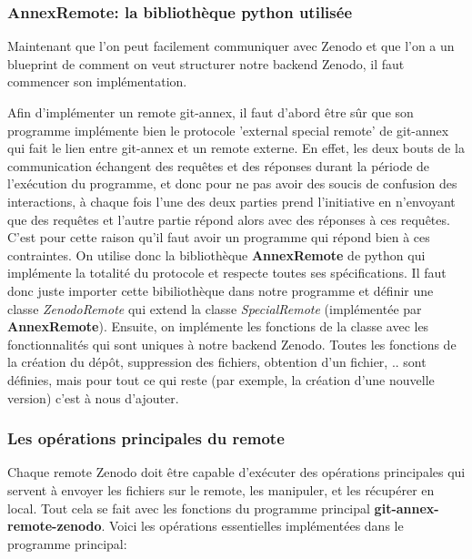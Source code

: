 \documentclass[11pt]{article}
\begin{document}
\subsubsection{AnnexRemote: la bibliothèque python utilisée}
\label{sec:org8c53dd8}
Maintenant que l'on peut facilement communiquer avec Zenodo et que
l'on a un blueprint de comment on veut structurer notre backend
Zenodo, il faut commencer son implémentation.

Afin d'implémenter un remote git-annex, il faut d'abord être sûr que
son programme implémente bien le protocole 'external special remote' de
git-annex qui fait le lien entre git-annex et un remote externe. En
effet, les deux bouts de la communication échangent des requêtes et des
réponses durant la période de l'exécution du programme, et donc pour
ne pas avoir des soucis de confusion des interactions, à chaque fois
l'une des deux parties prend l'initiative en n'envoyant que des
requêtes et l'autre partie répond alors avec des réponses à ces requêtes. 
C'est pour cette raison qu'il faut avoir un programme qui répond bien
à ces contraintes. On utilise donc la bibliothèque \textbf{AnnexRemote} de
python qui implémente la totalité du protocole et respecte toutes ses
spécifications. Il faut donc juste importer cette bibiliothèque dans
notre programme et définir une classe \emph{ZenodoRemote} qui extend la classe
\emph{SpecialRemote} (implémentée par \textbf{AnnexRemote}). Ensuite, on implémente
les fonctions de la classe avec les fonctionnalités qui sont uniques
à notre backend Zenodo. Toutes les fonctions de la création du dépôt,
suppression des fichiers, obtention d'un fichier, .. sont définies,
mais pour tout ce qui reste (par exemple, la création d'une nouvelle
version) c'est à nous d'ajouter.

\subsubsection{Les opérations principales du remote}
\label{sec:orgd98003f}
Chaque remote Zenodo doit être capable d'exécuter des opérations
principales qui servent à envoyer les fichiers sur le remote, les
manipuler, et les récupérer en local. Tout cela se fait avec les
fonctions du programme principal \textbf{git-annex-remote-zenodo}. Voici les
opérations essentielles implémentées dans le programme principal:
\end{document}
